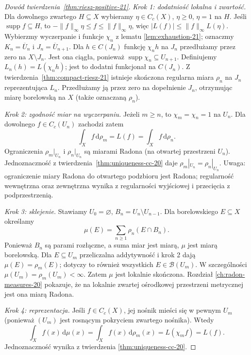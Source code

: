 \begin{proof}[Dowód twierdzenia~\ref{thm:riesz-positive-21}]
\emph{Krok 1: dodatniość lokalna i zwartość.}
Dla dowolnego zwartego $H\subseteq X$ wybieramy
$\eta\in C_c(X)$, $\eta\ge0$, $\eta=1$ na $H$.
Jeśli $\operatorname{supp}f\subseteq H$, to
$-\|f\|_\infty\eta\le f\le\|f\|_\infty\eta$,
więc $|L(f)|\le\|f\|_\infty L(\eta)$.
Wybierzmy wyczerpanie i funkcje $\chi_n$ z lematu
\ref{lem:exhaustion-21}; oznaczmy $K_n=\overline U_n$
i $J_n=\overline U_{n+1}$.
Dla $h\in C(J_n)$ funkcję $\chi_nh$ na $J_n$
przedłużamy przez zero na $X\setminus J_n$.
Jest ona ciągła, ponieważ
$\operatorname{supp}\chi_n\subseteq U_{n+1}$.
Definiujemy $L_n(h)=L(\chi_nh)$; jest to dodatni
funkcjonał na $C(J_n)$.
Z twierdzenia~\ref{thm:compact-riesz-21}
istnieje skończona regularna miara $\rho_n$
na $J_n$ reprezentująca $L_n$. Przedłużamy ją
przez zero na dopełnienie $J_n$, otrzymując miarę
borelowską na $X$ (także oznaczaną $\rho_n$).

\emph{Krok 2: zgodność miar na wyczerpaniu.}
Jeżeli $m\ge n$, to $\chi_m=\chi_n=1$ na $U_n$.
Dla dowolnego $f\in C_c(U_n)$ zachodzi zatem
\[
 \int_Xf\,\mathrm d\rho_m=L(f)
  =\int_Xf\,\mathrm d\rho_n.
\]
Ograniczenia $\rho_m|_{U_n}$ i $\rho_n|_{U_n}$
są miarami Radona (na otwartej przestrzeni $U_n$).
Jednoznaczność z twierdzenia~\ref{thm:uniqueness-cc-20}
daje $\rho_m|_{U_n}=\rho_n|_{U_n}$.
Uwaga: ograniczenie miary Radona do otwartego podzbioru
jest Radona; regularność wewnętrzna oraz zewnętrzna
wynika z regularności wyjściowej i przecięcia z podprzestrzenią.

\emph{Krok 3: sklejenie.}
Stawiamy $U_0=\varnothing$, $B_n=U_n\setminus U_{n-1}$.
Dla borelowskiego $E\subseteq X$ określamy
\begin{equation}\label{eq:gluing-measures-21}
 \mu(E)=\sum_{n\ge1}\rho_n(E\cap B_n).
\end{equation}
Ponieważ $B_n$ są parami rozłączne, a suma miar jest
miarą, $\mu$ jest miarą borelowską. Dla $E\subseteq U_m$
przeliczalna addytywność i krok 2 dają
$\mu(E)=\rho_m(E)$; dotyczy to również wszystkich
$E\in\mathcal B(U_m)$. W szczególności
$\mu(U_m)=\rho_m(U_m)<\infty$.
Zatem $\mu$ jest lokalnie skończona. Rozdział
\ref{ch:radon-measures-20} pokazuje, że na lokalnie
zwartej ośrodkowej przestrzeni metrycznej jest ona
miarą Radona.

\emph{Krok 4: reprezentacja.}
Jeśli $f\in C_c(X)$, jej nośnik mieści się w pewnym
$U_m$ (ponieważ $(U_m)$ jest rosnącym pokryciem
zwartego nośnika). Wtedy
\[
 \int_X f(x)\,\mathrm d\mu(x)
 =\int_X f(x)\,\mathrm d\rho_m(x)
 =L(\chi_m f)=L(f).
\]
Jednoznaczność wynika z twierdzenia
\ref{thm:uniqueness-cc-20}.
\end{proof}


